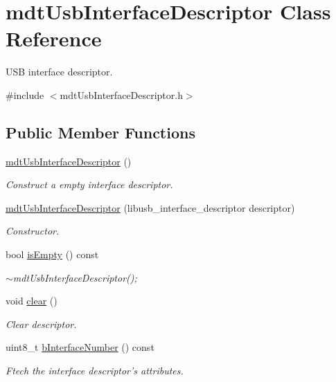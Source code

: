 \hypertarget{classmdt_usb_interface_descriptor}{\section{mdt\-Usb\-Interface\-Descriptor Class Reference}
\label{classmdt_usb_interface_descriptor}
}


U\-S\-B interface descriptor.  




{\ttfamily \#include $<$mdt\-Usb\-Interface\-Descriptor.\-h$>$}

\subsection*{Public Member Functions}
\begin{DoxyCompactItemize}
\item 
\hyperlink{classmdt_usb_interface_descriptor_a2f566ab157bd2fe7a0ab5133dc094ed6}{mdt\-Usb\-Interface\-Descriptor} ()
\begin{DoxyCompactList}\small\item\em Construct a empty interface descriptor. \end{DoxyCompactList}\item 
\hyperlink{classmdt_usb_interface_descriptor_ae8fdc326f89252fd4309f5ef6f5d4c74}{mdt\-Usb\-Interface\-Descriptor} (libusb\-\_\-interface\-\_\-descriptor descriptor)
\begin{DoxyCompactList}\small\item\em Constructor. \end{DoxyCompactList}\item 
bool \hyperlink{classmdt_usb_interface_descriptor_ab4538d89db1cc877ab24202337203ea9}{is\-Empty} () const 
\begin{DoxyCompactList}\small\item\em $\sim$mdt\-Usb\-Interface\-Descriptor(); \end{DoxyCompactList}\item 
void \hyperlink{classmdt_usb_interface_descriptor_a058ff56115c963be3f45fa288fd01551}{clear} ()
\begin{DoxyCompactList}\small\item\em Clear descriptor. \end{DoxyCompactList}\item 
uint8\-\_\-t \hyperlink{classmdt_usb_interface_descriptor_a3abfad5244d01736c071b9fe6649407b}{b\-Interface\-Number} () const 
\begin{DoxyCompactList}\small\item\em Ftech the interface descriptor's attributes. \end{DoxyCompactList}\item 

\end{DoxyCompactItemize}
